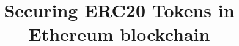 \documentclass[conference,compsoc]{IEEEtran}
\begin{document}
\title{Securing ERC20 Tokens in Ethereum blockchain}
\author{
	\IEEEauthorblockN{ }
	\IEEEauthorblockA{ }
}

\maketitle

		
\IEEEpeerreviewmaketitle









\end{document}
